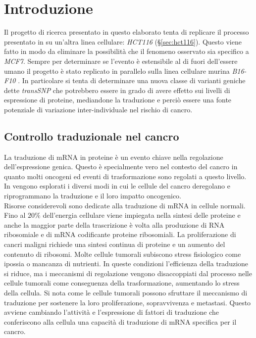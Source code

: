 \chapter{Introduzione}
\label{cha:intro}
Il progetto di ricerca presentato in questo elaborato tenta di replicare il processo presentato in \cite{transsnp} su un'altra linea cellulare: \emph{HCT116} (\S\ref{sec:hct116}).
Questo viene fatto in modo da eliminare la possibilit\`a che il fenomeno osservato sia specifico a \emph{MCF7}.
Sempre per determinare se l'evento \`e estensibile al di fuori dell'essere umano il progetto \`e stato replicato in parallelo sulla linea cellulare murina \emph{B16-F10} \cite{elisa}.
In particolare si tenta di determinare una nuova classe di varianti geniche dette \emph{transSNP} che potrebbero essere in grado di avere effetto sui livelli di espressione di proteine, mediandone la traduzione e perci\`o essere una fonte potenziale di variazione inter-individuale nel rischio di cancro.
\section{Controllo traduzionale nel cancro}
La traduzione di mRNA in proteine \`e un evento chiave nella regolazione dell'espressione genica.
Questo \`e specialmente vero nel contesto del cancro in quanto molti oncogeni ed eventi di trasformazione sono regolati a questo livello.
In \cite{tranconcancer} vengono esplorati i diversi modi in cui le cellule del cancro deregolano e riprogrammano la traduzione e il loro impatto oncogenico.\\
Risorse considerevoli sono dedicate alla traduzione di mRNA in cellule normali.
Fino al $20\%$ dell'energia cellulare viene impiegata nella sintesi delle proteine e anche la maggior parte della trascrizione \`e volta alla produzione di RNA ribosomiale e di mRNA codificante proteine ribosomiali.
La proliferazione di cancri maligni richiede una sintesi continua di proteine e un aumento del contenuto di ribosomi.
Molte cellule tumorali subiscono stress fisiologico come ipossia o mancanza di nutrienti.
In queste condizioni l'efficienza della traduzione si riduce, ma i meccanismi di regolazione vengono disaccoppiati dal processo nelle cellule tumorali come conseguenza della trasformazione, aumentando lo stress della cellula.
Si nota come le cellule tumorali possono sfruttare il meccanismo di traduzione per sostenere la loro proliferazione, sopravvivenza e metastasi.
Questo avviene cambiando l'attivit\`a e l'espressione di fattori di traduzione che conferiscono alla cellula una capacit\`a di traduzione di mRNA specifica per il cancro.

